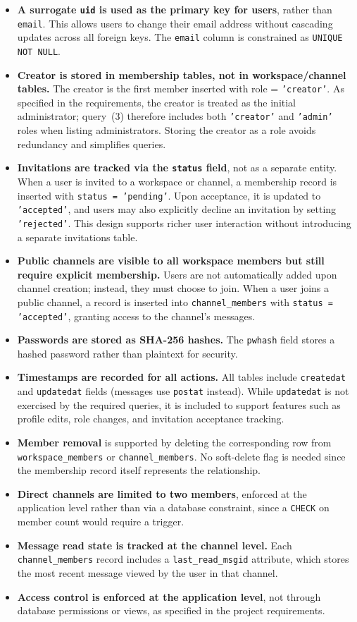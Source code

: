 \documentclass[11pt]{article}
\begin{document}
\begin{itemize}
\item \textbf{A surrogate \texttt{uid} is used as the primary key for users}, rather than \texttt{email}. This allows users to change their email address without cascading updates across all foreign keys. The \texttt{email} column is constrained as \texttt{UNIQUE NOT NULL}.
\item \textbf{Creator is stored in membership tables, not in workspace/channel tables.} The creator is the first member inserted with role = \texttt{'creator'}. As specified in the requirements, the creator is treated as the initial administrator; query~(3) therefore includes both \texttt{'creator'} and \texttt{'admin'} roles when listing administrators. Storing the creator as a role avoids redundancy and simplifies queries.
\item \textbf{Invitations are tracked via the \texttt{status} field}, not as a separate entity. When a user is invited to a workspace or channel, a membership record is inserted with \texttt{status = 'pending'}. Upon acceptance, it is updated to \texttt{'accepted'}, and users may also explicitly decline an invitation by setting \texttt{'rejected'}. This design supports richer user interaction without introducing a separate invitations table.
\item \textbf{Public channels are visible to all workspace members but still require explicit membership.} Users are not automatically added upon channel creation; instead, they must choose to join. When a user joins a public channel, a record is inserted into \texttt{channel\_members} with \texttt{status = 'accepted'}, granting access to the channel's messages.
\item \textbf{Passwords are stored as SHA-256 hashes.} The \texttt{pwhash} field stores a hashed password rather than plaintext for security.
\item \textbf{Timestamps are recorded for all actions.} All tables include \texttt{createdat} and \texttt{updatedat} fields (messages use \texttt{postat} instead). While \texttt{updatedat} is not exercised by the required queries, it is included to support features such as profile edits, role changes, and invitation acceptance tracking.
\item \textbf{Member removal} is supported by deleting the corresponding row from \texttt{workspace\_members} or \texttt{channel\_members}. No soft-delete flag is needed since the membership record itself represents the relationship.
\item \textbf{Direct channels are limited to two members}, enforced at the application level rather than via a database constraint, since a \texttt{CHECK} on member count would require a trigger.
\item \textbf{Message read state is tracked at the channel level.} Each \texttt{channel\_members} record includes a \texttt{last\_read\_msgid} attribute, which stores the most recent message viewed by the user in that channel.
\item \textbf{Access control is enforced at the application level}, not through database permissions or views, as specified in the project requirements.
\end{itemize}
\end{document}
